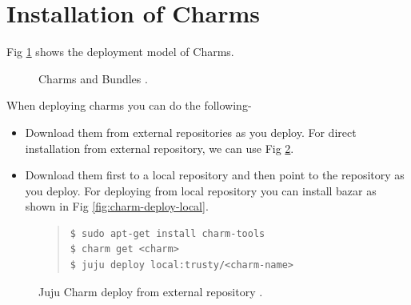 \documentclass[9pt,twocolumn,twoside]{../../styles/osajnl}
\begin{document}
\section{Installation of Charms}
Fig \ref{fig:charms-bundles-2x} shows the deployment model of Charms.

\begin{figure}[htbp]
  \centering
  \caption{Charms and Bundles \cite{www-juju}.}
  \label{fig:charms-bundles-2x}
\end{figure}

When deploying charms you can do the following-
\begin{itemize}
\item[1.] Download them from external repositories as you deploy. For
  direct installation from external repository, we can use Fig
  \ref{fig:charm-deploy}.

\item[2.] Download them first to a local repository and then point to
  the repository as you deploy. For deploying from local repository
  you can install bazar as shown in Fig \ref{fig:charm-deploy-local}.
  
\end{itemize}


\begin{figure}
  \caption{Juju Charm deploy from external repository \cite{www-juju}.}
  \label{fig:charm-deploy}
  \begin{quote}
    \begin{Verbatim}
$ sudo apt-get install charm-tools
$ charm get <charm>
$ juju deploy local:trusty/<charm-name>
    \end{Verbatim}
  \end{quote}
\end{figure}
\end{document}
